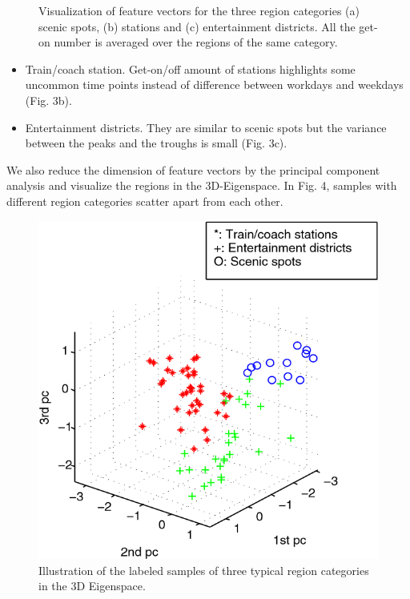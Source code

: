 \documentclass[a4paper, 10pt, conference]{ieeeconf}      %
\begin{document}
\begin{figure}[htbp]
{    }
    \caption{Visualization of feature vectors for the three region categories (a) scenic spots, (b) stations and (c) entertainment districts. All the get-on number is averaged over the regions of the same category.}
    \label{fig:my_label_3}
\end{figure}

\begin{itemize}

\item Train/coach station. Get-on/off amount of stations highlights some uncommon time points instead of difference between workdays and weekdays (Fig. 3b).
\item Entertainment districts. They are similar to scenic spots but the variance between the peaks and the troughs is small (Fig. 3c).

\end{itemize}

We also reduce the dimension of feature vectors by the principal component analysis and visualize the regions in the 3D-Eigenspace. In Fig. 4, samples with different region categories scatter apart from each other.

\begin{figure}[thbp]
    \centering
    \includegraphics{fig/f6.png}
    \caption{Illustration of the labeled samples of three typical region categories in the 3D Eigenspace.}
    \label{fig:my_label_4}
\end{figure}
\end{document}
